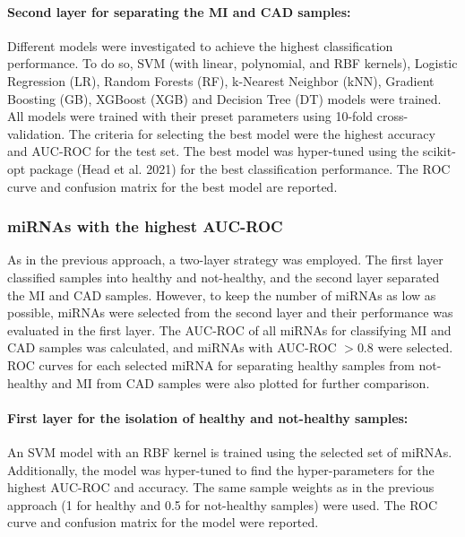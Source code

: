 \documentclass[
]{article}
\begin{document}
\hypertarget{second-layer-for-separating-the-mi-and-cad-samples}{%
\paragraph{Second layer for separating the MI and CAD
samples:}\label{second-layer-for-separating-the-mi-and-cad-samples}}

Different models were investigated to achieve the highest classification
performance. To do so, SVM (with linear, polynomial, and RBF kernels),
Logistic Regression (LR), Random Forests (RF), k-Nearest Neighbor (kNN),
Gradient Boosting (GB), XGBoost (XGB) and Decision Tree (DT) models were
trained. All models were trained with their preset parameters using
10-fold cross-validation. The criteria for selecting the best model were
the highest accuracy and AUC-ROC for the test set. The best model was
hyper-tuned using the scikit-opt package (Head et al. 2021) for the best
classification performance. The ROC curve and confusion matrix for the
best model are reported.

\hypertarget{mirnas-with-the-highest-auc-roc}{%
\subsubsection{miRNAs with the highest
AUC-ROC}\label{mirnas-with-the-highest-auc-roc}}

As in the previous approach, a two-layer strategy was employed. The
first layer classified samples into healthy and not-healthy, and the
second layer separated the MI and CAD samples. However, to keep the
number of miRNAs as low as possible, miRNAs were selected from the
second layer and their performance was evaluated in the first layer. The
AUC-ROC of all miRNAs for classifying MI and CAD samples was calculated,
and miRNAs with AUC-ROC \(> 0.8\) were selected. ROC curves for each
selected miRNA for separating healthy samples from not-healthy and MI
from CAD samples were also plotted for further comparison.

\hypertarget{first-layer-for-the-isolation-of-healthy-and-not-healthy-samples-1}{%
\paragraph{First layer for the isolation of healthy and not-healthy
samples:}\label{first-layer-for-the-isolation-of-healthy-and-not-healthy-samples-1}}

An SVM model with an RBF kernel is trained using the selected set of
miRNAs. Additionally, the model was hyper-tuned to find the
hyper-parameters for the highest AUC-ROC and accuracy. The same sample
weights as in the previous approach (1 for healthy and 0.5 for
not-healthy samples) were used. The ROC curve and confusion matrix for
the model were reported.
\end{document}
